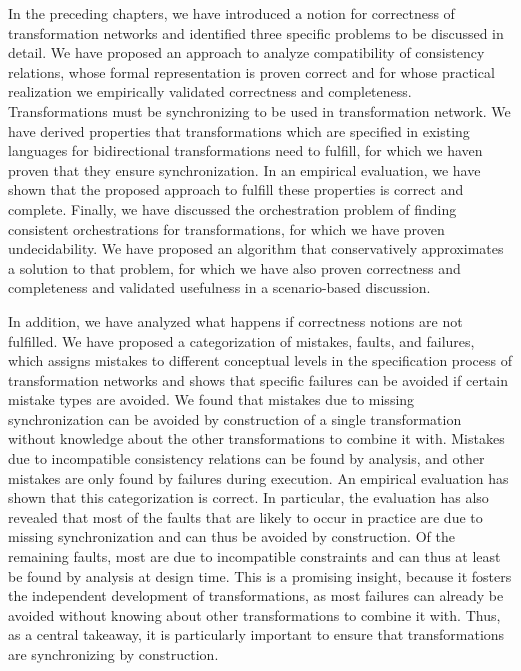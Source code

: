 In the preceding chapters, we have introduced a notion for correctness of transformation networks and identified three specific problems to be discussed in detail.
We have proposed an approach to analyze compatibility of consistency relations, whose formal representation is proven correct and for whose practical realization we empirically validated correctness and completeness.
Transformations must be synchronizing to be used in transformation network.
We have derived properties that transformations which are specified in existing languages for bidirectional transformations need to fulfill, for which we haven proven that they ensure synchronization.
In an empirical evaluation, we have shown that the proposed approach to fulfill these properties is correct and complete.
Finally, we have discussed the orchestration problem of finding consistent orchestrations for transformations, for which we have proven undecidability.
We have proposed an algorithm that conservatively approximates a solution to that problem, for which we have also proven correctness and completeness and validated usefulness in a scenario-based discussion.

In addition, we have analyzed what happens if correctness notions are not fulfilled.
We have proposed a categorization of mistakes, faults, and failures, which assigns mistakes to different conceptual levels in the specification process of transformation networks and shows that specific failures can be avoided if certain mistake types are avoided.
We found that mistakes due to missing synchronization can be avoided by construction of a single transformation without knowledge about the other transformations to combine it with.
Mistakes due to incompatible consistency relations can be found by analysis, and other mistakes are only found by failures during execution.
An empirical evaluation has shown that this categorization is correct.
In particular, the evaluation has also revealed that most of the faults that are likely to occur in practice are due to missing synchronization and can thus be avoided by construction.
Of the remaining faults, most are due to incompatible constraints and can thus at least be found by analysis at design time.
This is a promising insight, because it fosters the independent development of transformations, as most failures can already be avoided without knowing about other transformations to combine it with.
Thus, as a central takeaway, it is particularly important to ensure that transformations are synchronizing by construction.

